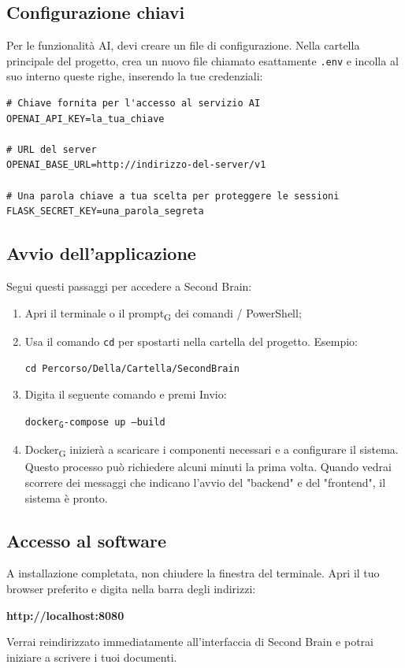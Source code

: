 \documentclass[11pt,a4paper]{article}
\newcommand{\gls}[1]{#1\textsubscript{G}}
\begin{document}
\subsection{Configurazione chiavi}
Per le funzionalità AI, devi creare un file di configurazione. 
Nella cartella principale del progetto, crea un nuovo file chiamato esattamente \texttt{.env} e incolla al suo interno queste righe, inserendo la tue credenziali:
\begin{verbatim}
# Chiave fornita per l'accesso al servizio AI
OPENAI_API_KEY=la_tua_chiave

# URL del server
OPENAI_BASE_URL=http://indirizzo-del-server/v1

# Una parola chiave a tua scelta per proteggere le sessioni
FLASK_SECRET_KEY=una_parola_segreta
\end{verbatim}

\subsection{Avvio dell'applicazione}
Segui questi passaggi per accedere a Second Brain:
\begin{enumerate}
    \item Apri il terminale o il \gls{prompt} dei comandi / PowerShell;
    \item Usa il comando \texttt{cd} per spostarti nella cartella del progetto. Esempio:
    \begin{center}
        \texttt{cd Percorso/Della/Cartella/SecondBrain}
    \end{center}
    \item Digita il seguente comando e premi Invio:
    \begin{center}
        \texttt{\gls{docker}-compose up --build}
    \end{center}
    \item \gls{Docker} inizierà a scaricare i componenti necessari e a configurare il sistema. Questo processo può richiedere alcuni minuti la prima volta. Quando vedrai scorrere dei messaggi che indicano l'avvio del "backend" e del "frontend", il sistema è pronto.
\end{enumerate}

\subsection{Accesso al software}
A installazione completata, non chiudere la finestra del terminale. Apri il tuo browser preferito e digita nella barra degli indirizzi:
\begin{center}
    \textbf{http://localhost:8080}
\end{center}
Verrai reindirizzato immediatamente all'interfaccia di Second Brain e potrai iniziare a scrivere i tuoi documenti.
\end{document}
